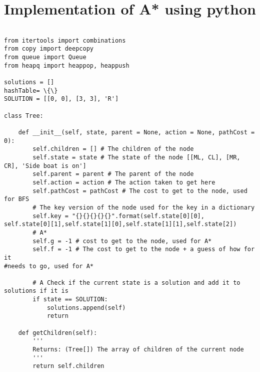\documentclass{article}
\begin{document}
\section{Implementation of A* using python}
\begin{verbatim}

from itertools import combinations
from copy import deepcopy
from queue import Queue
from heapq import heappop, heappush

solutions = []
hashTable= \{\}
SOLUTION = [[0, 0], [3, 3], 'R']

class Tree:

    def __init__(self, state, parent = None, action = None, pathCost = 0):
        self.children = [] # The children of the node 
        self.state = state # The state of the node [[ML, CL], [MR, CR], 'Side boat is on']
        self.parent = parent # The parent of the node
        self.action = action # The action taken to get here
        self.pathCost = pathCost # The cost to get to the node, used for BFS
        # The key version of the node used for the key in a dictionary
        self.key = "{}{}{}{}{}".format(self.state[0][0],
self.state[0][1],self.state[1][0],self.state[1][1],self.state[2])
        # A*
        self.g = -1 # cost to get to the node, used for A*
        self.f = -1 # The cost to get to the node + a guess of how for it 
#needs to go, used for A*

        # A Check if the current state is a solution and add it to solutions if it is
        if state == SOLUTION:
            solutions.append(self)
            return
    
    def getChildren(self):
        '''
        Returns: (Tree[]) The array of children of the current node
        '''
        return self.children
\end{verbatim}
\newpage
\end{document}
